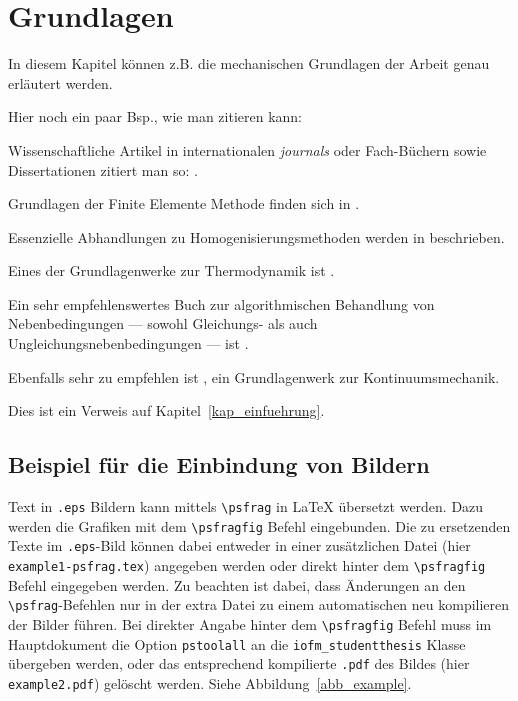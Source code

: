 
\thispagestyle{empty} %

\chapter{Grundlagen}
\thispagestyle{fancy}
\label{kap_grundlagen}

In diesem Kapitel können z.B. die mechanischen Grundlagen der Arbeit genau erläutert werden.

Hier noch ein paar Bsp., wie man zitieren kann:

Wissenschaftliche Artikel in internationalen \textit{journals} oder Fach-Büchern sowie Dissertationen zitiert man so: \cite{Kiefer_Bartel_Menzel_SmartMatStruct_2012,Bartel_Menzel_Svendsen_JMPS_2011,Bartel_Diss}.

Grundlagen der Finite Elemente Methode finden sich in \cite{Bathe}.

Essenzielle Abhandlungen zu Homogenisierungsmethoden werden in \cite{Eshelby01,HashinShtrikman01} beschrieben.

Eines der Grundlagenwerke zur Thermodynamik ist \cite{Truesdell_Noll_01}.

Ein sehr empfehlenswertes Buch zur algorithmischen Behandlung von Nebenbedingungen --- sowohl Gleichungs- als auch Ungleichungsnebenbedingungen --- ist \cite{Bertsekas_01}.

Ebenfalls sehr zu empfehlen ist \cite{Ciarlet_01}, ein Grundlagenwerk zur Kontinuumsmechanik.




Dies ist ein Verweis auf Kapitel~\ref{kap_einfuehrung}.

\newpage

\section{Beispiel für die Einbindung von Bildern}

Text in \texttt{.eps} Bildern kann mittels \verb|\psfrag| in LaTeX übersetzt werden. Dazu werden die Grafiken mit dem \verb|\psfragfig| Befehl eingebunden. Die zu ersetzenden Texte im \texttt{.eps}-Bild können dabei entweder in einer zusätzlichen Datei (hier \texttt{example1-psfrag.tex}) angegeben werden oder direkt hinter dem \verb|\psfragfig| Befehl eingegeben werden. Zu beachten ist dabei, dass Änderungen an den \verb|\psfrag|-Befehlen nur in der extra Datei zu einem automatischen neu kompilieren der Bilder führen. Bei direkter Angabe hinter dem \verb|\psfragfig| Befehl muss im Hauptdokument die Option \verb|pstoolall| an die \verb|iofm_studentthesis| Klasse übergeben werden, oder das entsprechend kompilierte \verb|.pdf| des Bildes (hier \texttt{example2.pdf}) gelöscht werden. Siehe Abbildung~\ref{abb_example}.

